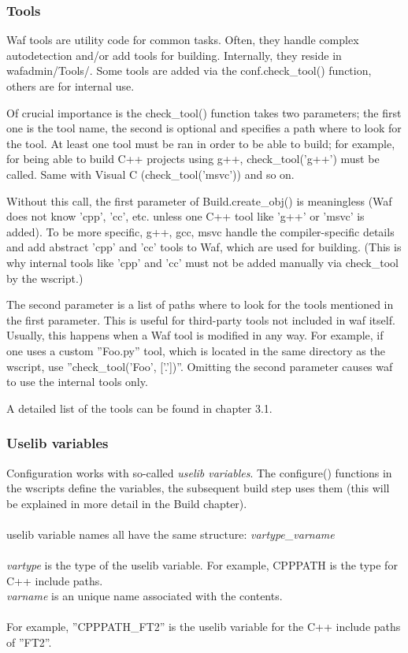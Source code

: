 \documentclass[a4,10pt]{article}
\begin{document}
\subsubsection{Tools}
Waf tools are utility code for common tasks. Often, they handle complex autodetection and/or add tools for building. Internally, they reside in wafadmin/Tools/. Some tools are added via the conf.check\_tool() function, others are for internal use.

Of crucial importance is the check\_tool() function takes two parameters; the first one is the tool name, the second is optional and specifies a path where to look for the tool. At least one tool must be ran in order to be able to build; for example, for being able to build C++ projects using g++, check\_tool('g++') must be called. Same with Visual C (check\_tool('msvc')) and so on.

Without this call, the first parameter of Build.create\_obj() is meaningless (Waf does not know 'cpp', 'cc', etc. unless one C++ tool like 'g++' or 'msvc' is added). To be more specific, g++, gcc, msvc handle the compiler-specific details and add abstract 'cpp' and 'cc' tools to Waf, which are used for building. (This is why internal tools like 'cpp' and 'cc' must not be added manually via check\_tool by the wscript.)

The second parameter is a list of paths where to look for the tools mentioned in the first parameter. This is useful for third-party tools not included in waf itself. Usually, this happens when a Waf tool is modified in any way. For example, if one uses a custom ''Foo.py'' tool, which is located in the same directory as the wscript, use ''check\_tool('Foo', ['.'])''. Omitting the second parameter causes waf to use the internal tools only.

A detailed list of the tools can be found in chapter 3.1.

\subsubsection{Uselib variables}
Configuration works with so-called \emph{uselib variables}. The configure() functions in the wscripts define the variables, the subsequent build step uses them (this will be explained in more detail in the Build chapter). \\
\\
uselib variable names all have the same structure: \emph{vartype}\_\emph{varname}\\
\\
\emph{vartype} is the type of the uselib variable. For example, CPPPATH is the type for C++ include paths.\\
\emph{varname} is an unique name associated with the contents.\\\\
For example, ''CPPPATH\_FT2'' is the uselib variable for the C++ include paths of ''FT2''.\\\\
\end{document}
